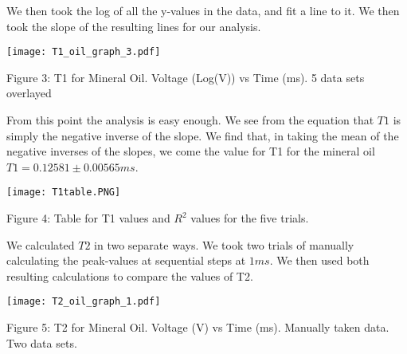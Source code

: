 \documentclass{article}
\begin{document}
    \bigskip
    We then took the log of all the y-values in the data, and fit a line to it. We then took the slope of the resulting lines for our analysis.
        \bigskip
    
    \begin{figure106}
    \centering    
    \texttt{[image: T1\_oil\_graph\_3.pdf]}
    \par
    \centering
    \par
    \caption{Figure 3: T1 for Mineral Oil. Voltage (Log(V)) vs Time (ms). 5 data sets overlayed}
    \par
    \end{figure106}
    \bigksip
    From this point the analysis is easy enough. We see from the equation that $T1$ is simply the negative inverse of the slope. We find that, in taking the mean of the negative inverses of the slopes, we come the value for T1 for the mineral oil $T1 = 0.12581 \pm 0.00565 ms$.
    
    \bigskip
    
     \begin{figure7889}
    \centering    
    \texttt{[image: T1table.PNG]}
    \par
    \centering
    \par
    \caption{Figure 4: Table for T1 values and $R^{2}$ values for the five trials.}
    \par
    \end{figure7889}
    
    \bigksip
    
    \par
    
    \bigskip
    
    We calculated $T2$ in two separate ways. We took two trials of manually calculating the peak-values at sequential steps at $1 ms$. We then used both resulting calculations to compare the values of T2.
    
    \bigskip
    
    \begin{figure55}
    \centering    
    \texttt{[image: T2\_oil\_graph\_1.pdf]}
    \par
    \centering
    \par
    \caption{Figure 5: T2 for Mineral Oil. Voltage (V) vs Time (ms). Manually taken data. Two data sets.}
    \par
    \end{figure55}
    \bigksip
    
    \bigskip
    
\end{document}
